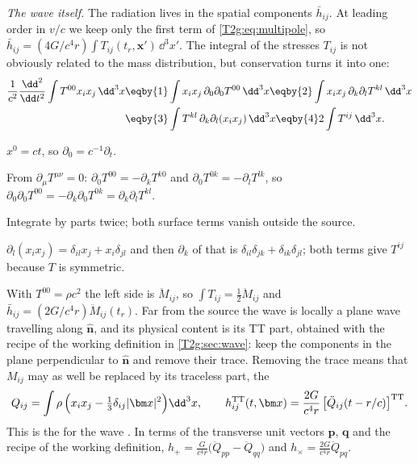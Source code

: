 \emph{The wave itself.} The radiation lives in the spatial components $\bar h_{ij}$. At leading order in $v/c$ we keep only the first term of \eqref{T2g:eq:multipole}, so $\bar h_{ij}=(4G/c^4r)\int T_{ij}(t_r,\bm x')\,\dd^3x'$. The integral of the stresses $T_{ij}$ is not obviously related to the mass distribution, but conservation turns it into one:
\begin{align}
  \frac{1}{c^2}\frac{\dd^2}{\dd t^2}\int T^{00}x_ix_j\,\dd^3x
  &\eqby{1}\int x_ix_j\,\partial_0\partial_0T^{00}\,\dd^3x
  \eqby{2}\int x_ix_j\,\partial_k\partial_lT^{kl}\,\dd^3x\nonumber\\
  &\eqby{3}\int T^{kl}\,\partial_k\partial_l(x_ix_j)\,\dd^3x
  \eqby{4}2\int T^{ij}\,\dd^3x .
  \label{T2g:eq:virial}
\end{align}
\begin{explain}
  \item $x^0=ct$, so $\partial_0=c^{-1}\partial_t$.
  \item From $\partial_\mu T^{\mu\nu}=0$: $\partial_0T^{00}=-\partial_kT^{k0}$ and $\partial_0T^{0k}=-\partial_lT^{lk}$, so $\partial_0\partial_0T^{00}=-\partial_k\partial_0T^{0k}=\partial_k\partial_lT^{kl}$.
  \item Integrate by parts twice; both surface terms vanish outside the source.
  \item $\partial_l(x_ix_j)=\delta_{il}x_j+x_i\delta_{jl}$ and then $\partial_k$ of that is $\delta_{il}\delta_{jk}+\delta_{ik}\delta_{jl}$; both terms give $T^{ij}$ because $T$ is symmetric.
\end{explain}
With $T^{00}=\rho c^2$ the left side is $\ddot M_{ij}$, so $\int T_{ij}=\tfrac12\ddot M_{ij}$ and $\bar h_{ij}=(2G/c^4r)\ddot M_{ij}(t_r)$. Far from the source the wave is locally a plane wave travelling along $\hat{\bm n}$, and its physical content is its TT part, obtained with the recipe of the working definition in \cref{T2g:sec:wave}: keep the components in the plane perpendicular to $\hat{\bm n}$ and remove their trace. Removing the trace means that $M_{ij}$ may as well be replaced by its traceless part, the 
\begin{equation}
  Q_{ij}=\int\rho\,\Big(x_ix_j-\tfrac13\delta_{ij}\lvert\bm x\rvert^2\Big)\dd^3x ,
  \qquad
  h_{ij}^{\rm TT}(t,\bm x)=\frac{2G}{c^4r}\,\big[\ddot Q_{ij}(t-r/c)\big]^{\rm TT} .
  \label{T2g:eq:hTT}
\end{equation}
This is the  for the wave \cite[Sec.~3.3]{Maggiore2007}. In terms of the transverse unit vectors $\bm p$, $\bm q$ and the recipe of the working definition, $h_+=\frac{G}{c^4r}\big(\ddot Q_{pp}-\ddot Q_{qq}\big)$ and $h_\times=\frac{2G}{c^4r}\ddot Q_{pq}$.

